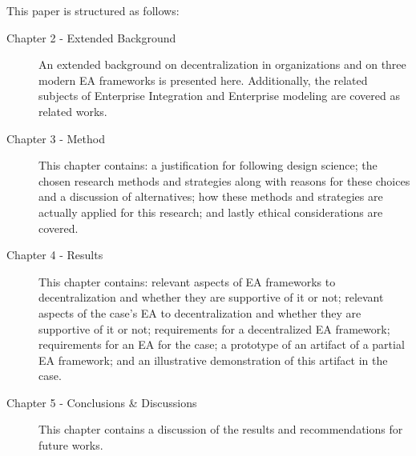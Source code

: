 This paper is structured as follows:
\begin{description}
  \item[Chapter 2 - Extended Background] An extended background on decentralization in organizations and on three modern EA frameworks is presented here. Additionally, the related subjects of Enterprise Integration and Enterprise modeling are covered as related works. 
  \item[Chapter 3 - Method] This chapter contains: a justification for following design science; the chosen research methods and strategies along with reasons for these choices and a discussion of alternatives; how these methods and strategies are actually applied for this research; and lastly ethical considerations are covered. 
  \item[Chapter 4 - Results] This chapter contains: relevant aspects of EA frameworks to decentralization and whether they are supportive of it or not; relevant aspects of the case's EA to decentralization and whether they are supportive of it or not; requirements for a decentralized EA framework; requirements for an EA for the case; a prototype of an artifact of a partial EA framework; and an illustrative demonstration of this artifact in the case. 
  \item[Chapter 5 - Conclusions \& Discussions] This chapter contains a discussion of the results and recommendations for future works. 
\end{description}